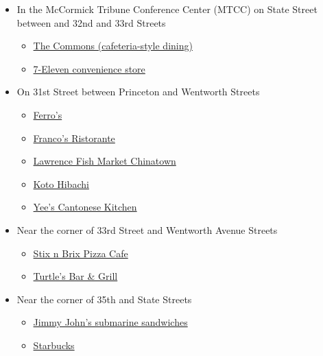 \documentclass[12pt,lettersize,oneside]{book} %
\begin{document}
\begin{itemize}
	\item In the McCormick Tribune Conference Center (MTCC) on State Street between and 32nd and 33rd Streets
	\begin{itemize}
		\item \href{https://dineoncampus.com/iit/hours-of-operation}{The Commons (cafeteria-style dining)}
		\item \href{https://www.yelp.com/biz/7-eleven-chicago-12}{7-Eleven convenience store}
	\end{itemize}
	\item On 31st Street between Princeton and Wentworth Streets
	\begin{itemize}
		\item \href{https://www.yelp.com/biz/ferros-chicago}{Ferro's}
		\item \href{https://www.francoschicago.com/}{Franco's Ristorante}
		\item \href{https://ct.lawrencefish.com/}{Lawrence Fish Market Chinatown}
		\item \href{https://kotohibachichicago.com/}{Koto Hibachi}
		\item \href{https://www.yelp.com/biz/yees-cantonese-kitchen-chicago-2}{Yee's Cantonese Kitchen}
	\end{itemize}
		\item Near the corner of 33rd Street and Wentworth Avenue Streets
	\begin{itemize}
		\item \href{https://stixnbrix33.com/}{Stix n Brix Pizza Cafe}
		\item \href{https://www.yelp.com/biz/turtles-bar-and-grill-chicago}{Turtle's Bar \& Grill}
	\end{itemize}

	\item Near the corner of 35th and State Streets
	\begin{itemize}
		\item \href{https://www.yelp.com/biz/jimmy-johns-chicago-22}{Jimmy John's submarine sandwiches}
		\item \href{https://www.yelp.com/biz/starbucks-chicago-113}{Starbucks}
	\end{itemize}


\end{itemize}



\end{document}
